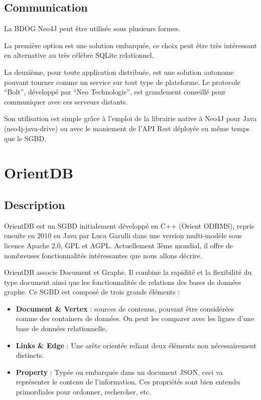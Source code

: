 \documentclass[a4paper,fleqn,12pt,oneside]{book}
\begin{document}
\subsection{Communication}

La BDOG Neo4J peut être utilisée sous plusieurs formes.

La première option est une solution embarquée, ce choix peut être très intéressant en alternative au très célèbre SQLite relationnel.

La deuxième, pour toute application distribuée, est une solution autonome pouvant tourner comme un service sur tout type de plateforme. Le protocole \enquote{Bolt}, développé par \enquote{Neo Technologie}, est grandement conseillé pour communiquer avec ces serveurs distants.

Son utilisation est simple grâce à l'emploi de la librairie native à Neo4J pour Java (neo4j-java-drive) ou avec le maniement de l’API Rest déployée en même temps que le SGBD.

\section{OrientDB}


\subsection{Description}

OrientDB est un SGBD initialement développé en C++ (Orient ODBMS), repris ensuite en 2010 en Java par Luca Garulli dans une version multi-modèle sous licence Apache 2.0, GPL et AGPL. Actuellement 3ème mondial\cite{DBEnginesSite}, il offre de nombreuses fonctionnalités intéressantes que nous allons décrire\cite{OrientDBSite}.

OrientDB associe Document et Graphe. Il combine la rapidité et la flexibilité du type document ainsi que les fonctionnalités de relations des bases de données graphe.
\newpage
Ce SGBD est composé de trois grands éléments :

\begin{itemize}
\item \textbf{Document \& Vertex} : sources de contenus, pouvant être considérées comme des containers de données. On peut les comparer avec les lignes d'une base de données relationnelle.
\item \textbf{Links \& Edge} : Une arête orientée reliant deux éléments non nécessairement distincts.
\item \textbf{Property} : Typée ou embarquée dans un document JSON, ceci va représenter le contenu de l'information. Ces propriétés sont bien entendu primordiales pour ordonner, rechercher, etc.
\end{itemize}
\end{document}
